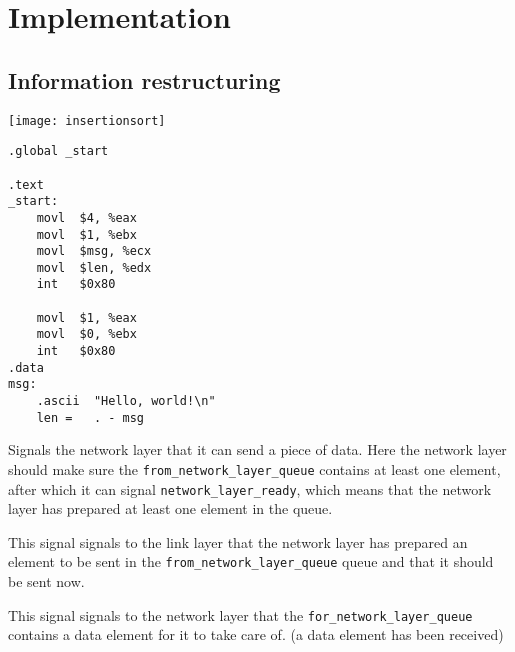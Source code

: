 \section{Implementation}
\subsection{Information restructuring}


\texttt{[image: insertionsort]}\par\vspace{0.5cm} %



\begin{lstlisting}
.global _start

.text
_start:
    movl  $4, %eax
    movl  $1, %ebx
    movl  $msg, %ecx
    movl  $len, %edx
    int   $0x80

    movl  $1, %eax
    movl  $0, %ebx
    int   $0x80
.data
msg:
    .ascii  "Hello, world!\n"
    len =   . - msg
\end{lstlisting}




\begin{description}[leftmargin=1em, style=nextline]
\item [\texttt{network\_layer\_allowed\_to\_send}] Signals the network layer that it can send a piece of data.
Here the network layer should make sure the \texttt{from\_network\_layer\_queue}
contains at least one element, after which it can signal \texttt{network\_layer\_ready},
which means that the network layer has prepared at least one element in the queue.

\item [\texttt{network\_layer\_ready}] This signal signals to the link layer that the network layer has prepared an element to be sent in the
  \texttt{from\_network\_layer\_queue} queue and that it should be sent now.

\item [\texttt{data\_for\_network\_layer}]
This signal signals to the network layer that the
\texttt{for\_network\_layer\_queue} contains a data element for it to take care of. (a data element has been received)
\end{description}

\hfill \break
